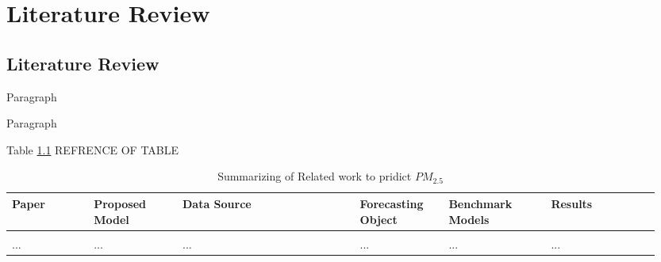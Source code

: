 
\chapter{Literature Review} %

\label{c2} %


\section{Literature Review}


\par Paragraph
\par Paragraph

Table \ref{table:Lr} REFRENCE OF TABLE

\begin{landscape}

\setlength{\tabcolsep}{3pt}

{\renewcommand{\arraystretch}{1}%
\begin{longtable}[c]{|p{0.12\linewidth}|p{0.13\linewidth}|p{0.26\linewidth}|p{0.13\linewidth}|p{0.15\linewidth}|p{0.16\linewidth}|}%
\caption{Summarizing of Related work to pridict $PM_{2.5}$}
\label{table:Lr}
\\ \hline
\textbf{Paper }                      & \textbf{Proposed Model}           & \textbf{Data Source} & \textbf{Forecasting Object}              & \textbf{Benchmark Models }                         & \textbf{Results}
\\ \hline
\endhead
%
&&&&&\\ \hline
...&...&...&...&...&...\\ \hline
\end{longtable}}
\end{landscape}
